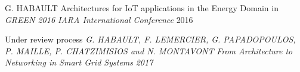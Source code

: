 \documentclass[11pt, a4paper]{awesome-cv}
\begin{document}
\begin{cvhonors}
  \cvpublication
  	{}
    {G. HABAULT}
    {Architectures for IoT applications in the Energy Domain}
    {in \textit{GREEN 2016 IARA International Conference}}
    {2016}
\end{cvhonors}

\begin{cvhonors}
  \cvpublication
  	{Under review process}
    {\textit{G. HABAULT, F. LEMERCIER, G. PAPADOPOULOS, P. MAILLE, P. CHATZIMISIOS and N. MONTAVONT}}
    {\textit{From Architecture to Networking in Smart Grid Systems}}
    {}
    {\textit{2017}}
\end{cvhonors}
\end{document}
